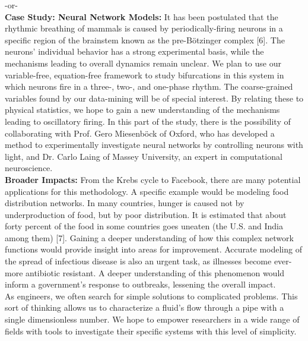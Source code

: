 \documentclass[11pt]{article}
\begin{document}
-or-
\\
\textbf{Case Study: Neural Network Models:} It has been postulated that the rhythmic breathing of mammals is caused by periodically-firing neurons in a specific region of the brainstem known as the pre-Bötzinger complex [6]. The neurons’ individual behavior has a strong experimental basis, while the mechanisms leading to overall dynamics remain unclear. We plan to use our variable-free, equation-free framework to study bifurcations in this system in which neurons fire in a three-, two-, and one-phase rhythm. The coarse-grained variables found by our data-mining will be of special interest. By relating these to physical statistics, we hope to gain a new understanding of the mechanisms leading to oscillatory firing. In this part of the study, there is the possibility of collaborating with Prof. Gero Miesenböck of Oxford, who has developed a method to experimentally investigate neural networks by controlling neurons with light, and Dr. Carlo Laing of Massey University, an expert in computational neuroscience.\\
\textbf{Broader Impacts:} From the Krebs cycle to Facebook, there are many potential applications for this methodology. A specific example would be modeling food distribution networks. In many countries, hunger is caused not by underproduction of food, but by poor distribution. It is estimated that about forty percent of the food in some countries goes uneaten (the U.S. and India among them) [7]. Gaining a deeper understanding of how this complex network functions would provide insight into areas for improvement. Accurate modeling of the spread of infectious disease is also an urgent task, as illnesses become ever-more antibiotic resistant. A deeper understanding of this phenomenon would inform a government’s response to outbreaks, lessening the overall impact.\\
\indent As engineers, we often search for simple solutions to complicated problems. This sort of thinking allows us to characterize a fluid's flow through a pipe with a single dimensionless number. We hope to empower researchers in a wide range of fields with tools to investigate their specific systems with this level of simplicity.\\
\end{document}
